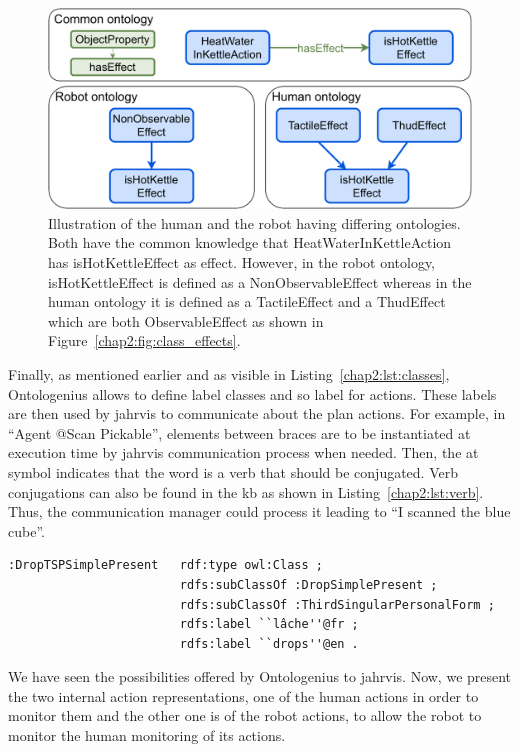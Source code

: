 \documentclass[a4paper,11pt,twoside]{StyleThese}
\begin{document}
\begin{figure}[!ht]
	\includegraphics[width=\linewidth]{figures/chapter2/kettle.pdf}
	\caption{Illustration of the human and the robot having differing ontologies. Both have the common knowledge that HeatWaterInKettleAction has isHotKettleEffect as effect. However, in the robot ontology, isHotKettleEffect is defined as a NonObservableEffect whereas in the human ontology it is defined as a TactileEffect and a ThudEffect which are both ObservableEffect as shown in Figure~\ref{chap2:fig:class_effects}.}
	\label{chap2:fig:kettle}
\end{figure}

Finally, as mentioned earlier and as visible in Listing~\ref{chap2:lst:classes}, Ontologenius allows to define label classes and so label for actions. These labels are then used by \acrshort{jahrvis} to communicate about the plan actions. For example, in ``{Agent} @Scan {Pickable}'', elements between braces are to be instantiated at execution time by \acrshort{jahrvis} communication process when needed. Then, the at symbol indicates that the word is a verb that should be conjugated. Verb conjugations can also be found in the \acrshort{kb} as shown in Listing~\ref{chap2:lst:verb}. Thus, the communication manager could process it leading to ``I scanned the blue cube''.

\begin{lstlisting}[style=OwlTurtle, label={chap2:lst:verb}, caption={Description of the class describing the verb Drop in the third-person present-tense, in the OWL language using the Turle syntax.} ]
:DropTSPSimplePresent	rdf:type owl:Class ;
						rdfs:subClassOf :DropSimplePresent ;
						rdfs:subClassOf :ThirdSingularPersonalForm ;
						rdfs:label ``lâche''@fr ;
						rdfs:label ``drops''@en .
\end{lstlisting}

We have seen the possibilities offered by Ontologenius to \acrshort{jahrvis}. Now, we present the two internal action representations, one of the human actions in order to monitor them and the other one is of the robot actions, to allow the robot to monitor the human monitoring of its actions. 
\end{document}
